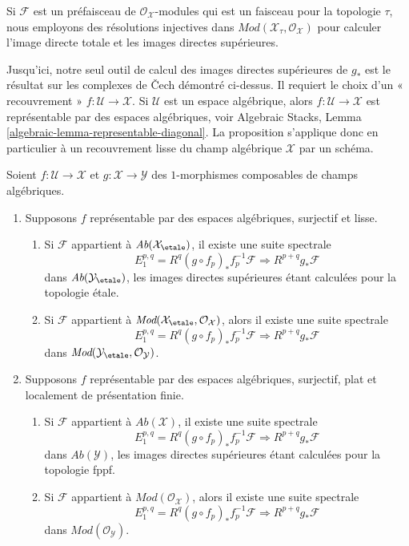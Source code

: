\medskip\noindent
Si $\mathcal{F}$ est un préfaisceau de $\mathcal{O}_\mathcal{X}$-modules
qui est un faisceau pour la topologie $\tau$, nous employons des résolutions
injectives dans $\textit{Mod}(\mathcal{X}_\tau, \mathcal{O}_\mathcal{X})$
pour calculer l'image directe totale et les images directes supérieures.

\medskip\noindent
Jusqu'ici, notre seul outil de calcul des images directes supérieures de $g_*$
est le résultat sur les complexes de {\v C}ech démontré ci-dessus. Il requiert le choix
d'un « recouvrement » $f : \mathcal{U} \to \mathcal{X}$. Si $\mathcal{U}$
est un espace algébrique, alors $f : \mathcal{U} \to \mathcal{X}$
est représentable par des espaces algébriques, voir
Algebraic Stacks, Lemma \ref{algebraic-lemma-representable-diagonal}.
La proposition s'applique donc en particulier à un recouvrement lisse du
champ algébrique $\mathcal{X}$ par un schéma.

\begin{proposition}
\label{proposition-smooth-covering-compute-direct-image}
Soient $f : \mathcal{U} \to \mathcal{X}$ et $g : \mathcal{X} \to \mathcal{Y}$
des $1$-morphismes composables de champs algébriques.
\begin{enumerate}
\item Supposons $f$ représentable par des espaces algébriques, surjectif et
lisse.
\begin{enumerate}
\item Si $\mathcal{F}$ appartient à $\textit{Ab}(\mathcal{X}_\etale)$,
il existe une suite spectrale
$$
E_1^{p, q} = R^q(g \circ f_p)_*f_p^{-1}\mathcal{F}
\Rightarrow
R^{p + q}g_*\mathcal{F}
$$
dans $\textit{Ab}(\mathcal{Y}_\etale)$, les images directes supérieures étant
calculées pour la topologie étale.
\item Si $\mathcal{F}$ appartient à
$\textit{Mod}(\mathcal{X}_\etale, \mathcal{O}_\mathcal{X})$, alors
il existe une suite spectrale
$$
E_1^{p, q} = R^q(g \circ f_p)_*f_p^{-1}\mathcal{F}
\Rightarrow
R^{p + q}g_*\mathcal{F}
$$
dans $\textit{Mod}(\mathcal{Y}_\etale, \mathcal{O}_\mathcal{Y})$.
\end{enumerate}
\item Supposons $f$ représentable par des espaces algébriques, surjectif,
plat et localement de présentation finie.
\begin{enumerate}
\item Si $\mathcal{F}$ appartient à $\textit{Ab}(\mathcal{X})$, il existe
une suite spectrale
$$
E_1^{p, q} = R^q(g \circ f_p)_*f_p^{-1}\mathcal{F}
\Rightarrow
R^{p + q}g_*\mathcal{F}
$$
dans $\textit{Ab}(\mathcal{Y})$, les images directes supérieures étant
calculées pour la topologie fppf.
\item Si $\mathcal{F}$ appartient à $\textit{Mod}(\mathcal{O}_\mathcal{X})$, alors
il existe une suite spectrale
$$
E_1^{p, q} = R^q(g \circ f_p)_*f_p^{-1}\mathcal{F}
\Rightarrow
R^{p + q}g_*\mathcal{F}
$$
dans $\textit{Mod}(\mathcal{O}_\mathcal{Y})$.
\end{enumerate}
\end{enumerate}
\end{proposition}

